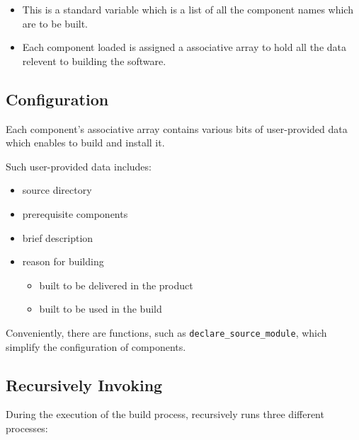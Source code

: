\begin{itemize}
\item \lmsbwcomponents

  This is a standard \gnumake variable which is a list of all
  the component names which are to be built.

\item {}

  Each component loaded is assigned a \gmsl associative array to
  hold all the data relevent to building the software.
\end{itemize}


\subsection{ Configuration}

Each component's associative array contains various bits of
user-provided data which enables \lmsbw to build and install it.

Such user-provided data includes:

\begin{itemize}
\item source directory
\item prerequisite components
\item brief description
\item reason for building
  \begin{itemize}
  \item built to be delivered in the product
  \item built to be used in the build
  \end{itemize}
\end{itemize}

Conveniently, there are \lmsbw functions, such as
\texttt{declare\_source\_module}, which simplify the
configuration of components.

\subsection{Recursively Invoking \make}

During the execution of the build process, \lmsbw recursively runs
three different \makefile processes:

